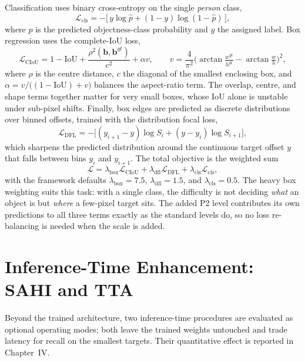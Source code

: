 Classification uses binary cross-entropy on the single \emph{person} class,
\begin{equation}
  \mathcal{L}_{\mathrm{cls}} = -\big[\, y \log \hat{p} + (1-y)\log(1-\hat{p}) \,\big],
\end{equation}
where $\hat{p}$ is the predicted objectness-class probability and $y$ the
assigned label. Box regression uses the complete-IoU loss,
\begin{equation}
  \mathcal{L}_{\mathrm{CIoU}} = 1 - \mathrm{IoU}
      + \frac{\rho^2(\mathbf{b}, \mathbf{b}^{gt})}{c^2} + \alpha v,
  \qquad
  v = \frac{4}{\pi^2}\Big(\arctan\tfrac{w^{gt}}{h^{gt}} - \arctan\tfrac{w}{h}\Big)^{\!2},
\end{equation}
where $\rho$ is the centre distance, $c$ the diagonal of the smallest enclosing
box, and $\alpha = v / \big((1-\mathrm{IoU}) + v\big)$ balances the aspect-ratio
term. The overlap, centre, and shape terms together matter for very small boxes,
whose IoU alone is unstable under sub-pixel shifts. Finally, box edges are
predicted as discrete distributions over binned offsets, trained with the
distribution focal loss,
\begin{equation}
  \mathcal{L}_{\mathrm{DFL}} = -\big[(y_{i+1}-y)\log S_i + (y-y_i)\log S_{i+1}\big],
\end{equation}
which sharpens the predicted distribution around the continuous target offset
$y$ that falls between bins $y_i$ and $y_{i+1}$. The total objective is the
weighted sum
\begin{equation}
  \mathcal{L} = \lambda_{\mathrm{box}} \mathcal{L}_{\mathrm{CIoU}}
              + \lambda_{\mathrm{dfl}} \mathcal{L}_{\mathrm{DFL}}
              + \lambda_{\mathrm{cls}} \mathcal{L}_{\mathrm{cls}},
\end{equation}
with the framework defaults $\lambda_{\mathrm{box}} = 7.5$,
$\lambda_{\mathrm{dfl}} = 1.5$, and $\lambda_{\mathrm{cls}} = 0.5$. The heavy
box weighting suits this task: with a single class, the difficulty is not
deciding \emph{what} an object is but \emph{where} a few-pixel target sits. The
added P2 level contributes its own predictions to all three terms exactly as
the standard levels do, so no loss re-balancing is needed when the scale is
added.

\section{Inference-Time Enhancement: SAHI and TTA}
Beyond the trained architecture, two inference-time procedures are evaluated as
optional operating modes; both leave the trained weights untouched and trade
latency for recall on the smallest targets. Their quantitative effect is
reported in Chapter~IV.

